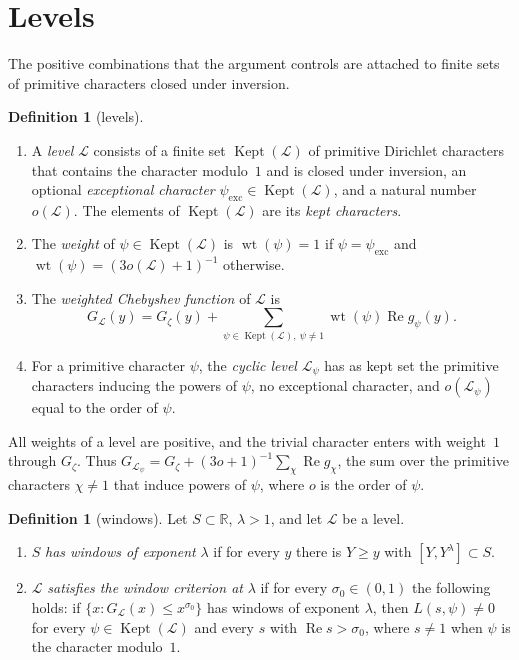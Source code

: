 \documentclass[11pt]{amsbook}
\theoremstyle{plain}
\theoremstyle{definition}
\newtheorem{definition}[theorem]{Definition}
\theoremstyle{remark}
\numberwithin{equation}{section}
\numberwithin{figure}{chapter}
\numberwithin{table}{chapter}
\newcommand{\R}{\mathbb{R}}
\newcommand{\lev}{\mathscr{L}}
\newcommand{\Gz}{G_{\zeta}}
\newcommand{\Kept}{\operatorname{Kept}}
\newcommand{\wt}{\operatorname{wt}}
\begin{document}
\section{Levels}

The positive combinations that the argument controls are attached to
finite sets of primitive characters closed under inversion.

\begin{definition}[levels]\label{def:level}
\begin{enumerate}[label=(\arabic*)]
\item A \emph{level} $\lev$ consists of a finite set $\Kept(\lev)$ of
primitive Dirichlet characters that contains the character
modulo~$1$ and is closed under inversion, an optional
\emph{exceptional character} $\psi_{\mathrm{exc}}\in\Kept(\lev)$, and
a natural number $o(\lev)$. The elements of $\Kept(\lev)$ are its
\emph{kept characters}.
\item The \emph{weight} of $\psi\in\Kept(\lev)$ is $\wt(\psi)=1$ if
$\psi=\psi_{\mathrm{exc}}$ and $\wt(\psi)=(3o(\lev)+1)^{-1}$
otherwise.
\item The \emph{weighted Chebyshev function} of $\lev$ is
\[
G_{\lev}(y)=\Gz(y)+\sum_{\psi\in\Kept(\lev),\ \psi\ne1}
\wt(\psi)\operatorname{Re}g_\psi(y).
\]
\item For a primitive character $\psi$, the \emph{cyclic level}
$\lev_\psi$ has as kept set the primitive characters inducing the
powers of $\psi$, no exceptional character, and $o(\lev_\psi)$ equal
to the order of $\psi$.
\end{enumerate}
\end{definition}

All weights of a level are positive, and the trivial character enters
with weight~$1$ through $\Gz$. Thus $G_{\lev_\psi}=\Gz+(3o+1)^{-1}
\sum_{\chi}\operatorname{Re}g_\chi$, the sum over the primitive
characters $\chi\ne1$ that induce powers of $\psi$, where $o$ is the
order of $\psi$.

\begin{definition}[windows]\label{def:windows}
Let $S\subset\R$, $\lambda>1$, and let $\lev$ be a level.
\begin{enumerate}[label=(\arabic*)]
\item $S$ \emph{has windows of exponent} $\lambda$ if for every $y$
there is $Y\ge y$ with $[Y,Y^\lambda]\subset S$.
\item $\lev$ \emph{satisfies the window criterion at} $\lambda$ if for
every $\sigma_0\in(0,1)$ the following holds: if
$\{x:G_{\lev}(x)\le x^{\sigma_0}\}$ has windows of exponent
$\lambda$, then $L(s,\psi)\ne0$ for every $\psi\in\Kept(\lev)$ and
every $s$ with $\operatorname{Re}s>\sigma_0$, where $s\ne1$ when
$\psi$ is the character modulo~$1$.
\end{enumerate}
\end{definition}
\end{document}
